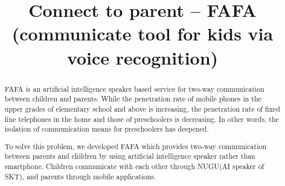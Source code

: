 \documentclass[conference]{IEEEtran}
\begin{document}
\title{Connect to parent – FAFA\\ \LARGE(communicate tool for kids via voice recognition)}

\author{
\and
{}
\and
{}
\and
{}
}

\maketitle

\begin{abstract}
FAFA is an artificial intelligence speaker based service for two-way communication between children and parents. While the penetration rate of mobile phones in the upper grades of elementary school and above is increasing, the penetration rate of fixed line telephones in the home and those of preschoolers is decreasing. In other words, the isolation of communication means for preschoolers has deepened.

To solve this problem, we developed FAFA which provides two-way communication between parents and children by using artificial intelligence speaker rather than smartphone. Children communicate with each other through NUGU(AI speaker of SKT), and parents through mobile applications. 

\end{abstract}
\end{document}
